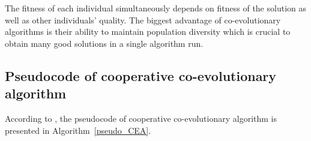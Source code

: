 The fitness of each individual simultaneously depends on fitness of the solution as well as other individuals' quality.
The biggest advantage of co-evolutionary algorithms is their ability to maintain population diversity which is crucial to obtain many good solutions in a single algorithm run.    

  
\subsection{Pseudocode of cooperative co-evolutionary algorithm}

According to \cite{co-evol}, the pseudocode of cooperative co-evolutionary algorithm is presented in Algorithm~\ref{pseudo_CEA}.

% 
% 
% 
% 
% 

